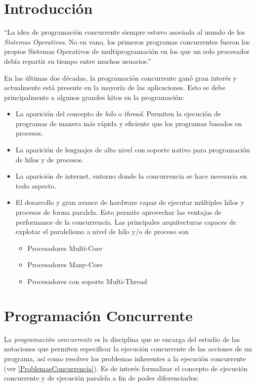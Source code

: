 \section{Introducción}
\label{IntroduccionConcurrencia}

``La idea de programación concurrente siempre estuvo asociada al mundo de los
\textit{Sistemas Operativos}. No en vano, los primeros programas concurrentes
fueron los propios Sistemas Operativos de multiprogramación en los que un solo
procesador debía repartir su tiempo entre muchos usuarios.''\cite{PalmaConcurrente}

En las últimas dos décadas, la programación concurrente ganó gran interés y
actualmente está presente en la mayoría de las aplicaciones.
Esto se debe principalmente a algunos grandes hitos en la programación:
\begin{itemize}
	\item La aparición del concepto de \textit{hilo} o \textit{thread}. Permiten la
	ejecución de programas de manera más rápida y eficiente que los programas
	basados en procesos.
	\item La aparición de lenguajes de alto nivel con soporte nativo para
	programación de hilos y de procesos.
	\item La aparición de internet, entorno donde la concurrencia se hace necesaria
	en todo aspecto.
	\item El desarrollo y gran avance de hardware capaz de ejecutar múltiples hilos
	y procesos de forma paralela. Esto permite aprovechar las ventajas de
	performance de la concurrencia. Las principales arquitecturas capaces de
	explotar el paralelismo a nivel de hilo y/o de proceso son
	\begin{itemize}
	    \item Procesadores Multi-Core
	    \item Procesadores Many-Core
	    \item Procesadores con soporte Multi-Thread
    \end{itemize}
\end{itemize}

\section{Programación Concurrente}
\label{ProgramacionConcurrente}

La \textit{programación concurrente} es la disciplina que se encarga del estudio
de las notaciones que permiten especificar la ejecución concurrente de las
acciones de un programa, así como resolver los problemas inherentes a la
ejecución concurrente (ver \ref{ProblemasConcurrencia}). Es de interés
formalizar el concepto de ejecución concurrente y de ejecución paralela a fin
de poder diferenciarlos:

